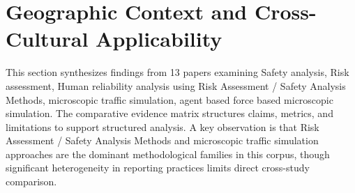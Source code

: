 \documentclass{article}
\begin{document}
\section{Geographic Context and Cross-Cultural Applicability}
This section synthesizes findings from 13 papers examining Safety analysis, Risk assessment, Human reliability analysis using Risk Assessment / Safety Analysis Methods, microscopic traffic simulation, agent based force based microscopic simulation. The comparative evidence matrix structures claims, metrics, and limitations to support structured analysis. A key observation is that Risk Assessment / Safety Analysis Methods and microscopic traffic simulation approaches are the dominant methodological families in this corpus, though significant heterogeneity in reporting practices limits direct cross-study comparison.
\end{document}
